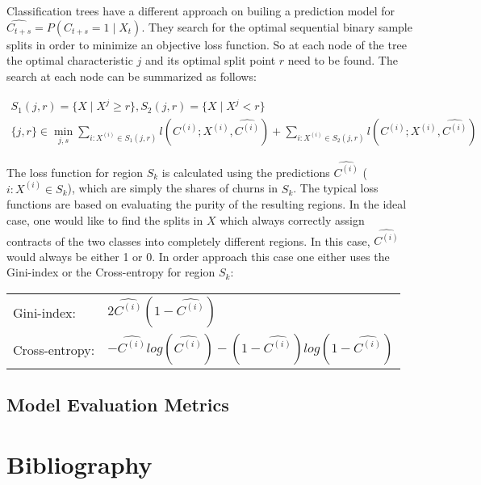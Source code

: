 \documentclass[12pt,titlepage]{article}
\begin{document}
Classification trees have a different approach on builing a prediction model for $\widehat{C_{t+s}} = P(C_{t+s}=1\mid X_{t})$. They search for the optimal sequential binary sample splits in order to minimize an objective loss function. So at each node of the tree the optimal characteristic $j$ and its optimal split point $r$ need to be found. The search at each node can be summarized as follows:

\begin{equation} \label{dec_tree}
    \begin{aligned}
        S_{1}(j, r) = \{X\mid X^{j}\geq r\} , S_{2}(j, r) = \{X\mid X^{j}< r\} \\
        \{j, r\} \in \min_{j, s} \sum_{i:X^{(i)}\in S_{1}(j, r)}l(C^{(i)}; X^{(i)}, \widehat{C^{(i)}}) + \sum_{i:X^{(i)}\in S_{2}(j, r)}l(C^{(i)}; X^{(i)}, \widehat{C^{(i)}})
    \end{aligned}
\end{equation}

The loss function for region $S_{k}$ is calculated using the predictions $\widehat{C^{(i)}}$ ($i:X^{(i)}\in S_{k}$), which are simply the shares of churns in $S_{k}$. The typical loss functions are based on evaluating the purity of the resulting regions. In the ideal case, one would like to find the splits in $X$ which always correctly assign contracts of the two classes into completely different regions. In this case, $\widehat{C^{(i)}}$ would always be either 1 or 0. In order approach this case one either uses the Gini-index or the Cross-entropy for region $S_{k}$: \\

\begin{center}
    \begin{tabular}{ll}
        Gini-index: & $2\widehat{C^{(i)}}(1-\widehat{C^{(i)}})$ \\
        Cross-entropy: & $-\widehat{C^{(i)}}log(\widehat{C^{(i)}}) - (1-\widehat{C^{(i)}})log(1-\widehat{C^{(i)}})$ \\
    \end{tabular}
\end{center}

\subsection{Model Evaluation Metrics} \par

\newpage

\thispagestyle{empty}

\section*{Bibliography}
\vspace*{6mm}
\end{document}
